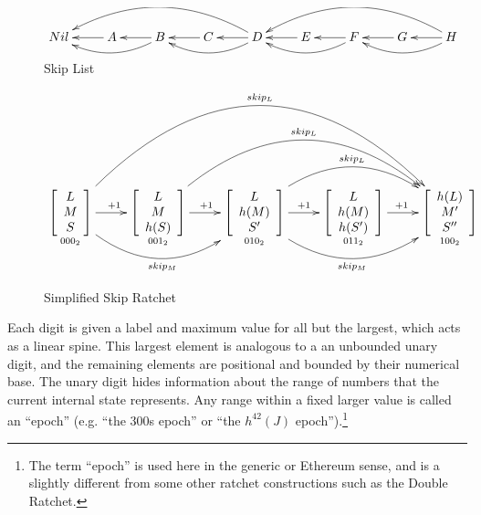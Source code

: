 \documentclass{article}
\begin{document}
	\begin{figure}[h]
		\centering
		
		$\xymatrix{
			  Nil
			& A \ar[l]
			& B \ar[l] , \ar@/^1pc/[ll]
			& C \ar[l]
			& D \ar[l] , \ar@/^1pc/[ll] , \ar@/_2pc/[llll]
			& E \ar[l]
			& F \ar[l] , \ar@/^1pc/[ll]
			& G \ar[l]
			& H \ar[l] , \ar@/^1pc/[ll] , \ar@/_2pc/[llll]
		}$
	
		\caption{Skip List}
		\label{fig:skip-list}
	\end{figure}

	\begin{figure}[h]
		\centering
		
		$\xymatrix{
		    \underset{000_{2}}{\left[ { \begin{array}{cc} L \\ M  \\ S \end{array} } \right]}
				\ar[r]^{+1}
				\ar@/_3pc/[rr]_{skip_{M}}
				\ar@/^7pc/[rrrr]^{skip_{L}}
    	 & \underset{001_{2}}{\left[ { \begin{array}{cc} L \\ M  \\ h(S) \end{array} } \right]}
	      		\ar[r]^{+1}
	      		\ar@/^4.75pc/[rrr]^{skip_{L}}
	     & \underset{010_{2}}{\left[ { \begin{array}{cc} L \\ h(M)  \\ S' \end{array} } \right]}
	      		\ar[r]^{+1}
	      		\ar@/_3pc/[rr]_{skip_{M}}
	      		\ar@/^3pc/[rr]^{skip_{L}}
    	 & \underset{011_{2}}{\left[ { \begin{array}{cc} L \\ h(M)  \\ h(S') \end{array} } \right]}
	      		\ar[r]^{+1}
	     & \underset{100_{2}}{\left[ { \begin{array}{cc} h(L) \\ M'  \\ S'' \end{array} } \right]}
		}$

		\caption{Simplified Skip Ratchet}
		\label{fig:compound-ratchet}
	\end{figure}

	Each digit is given a label and maximum value for all but the largest, which acts as a linear spine. This largest element is analogous to a an unbounded unary digit, and the remaining elements are positional and bounded by their numerical base. The unary digit hides information about the range of numbers that the current internal state represents. Any range within a fixed larger value is called an ``epoch'' (e.g. ``the 300s epoch'' or ``the $h^{42}(J)$ epoch'').\footnote{The term ``epoch'' is used here in the generic or Ethereum\cite{ethereum-yellowpaper} sense, and is a slightly different from some other ratchet constructions such as the Double Ratchet\cite{double-ratchet-modularization}.}
	
\end{document}
